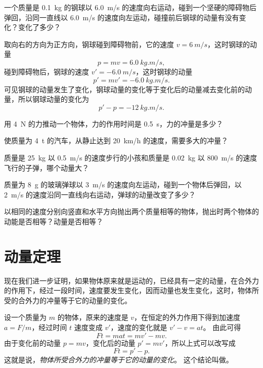 \begin{example}
一个质量是 \qty{0.1}{kg} 的钢球以 \qty{6.0}{m/s} 的速度向右运动，碰到一个坚硬的障碍物后弹回，沿同一直线以 \qty{6.0}{m/s} 的速度向左运动，碰撞前后钢球的动量有没有变化？变化了多少？
\end{example}

\begin{solution}
取向右的方向为正方向，钢球碰到障碍物前，它的速度 $v=\qty{6}{m/s}$，这时钢球的动量
\[p=mv=\qty{6.0}{kg.m/s},\]
碰到障碍物后，钢球的速度 $v'=\qty{-6.0}{m/s}$，这时钢球的动量
\[p'=mv'=\qty{-6.0}{kg.m/s}.\]
可见钢球的动量发生了变化，钢球动量的变化等于变化后的动量减去变化前的动量，所以钢球动量的变化为
\[p'-p=\qty{-12}{kg.m/s}.\]
\end{solution}

\begin{Practice}
\begin{question}
  \item 用 \qty{4}{N} 的力推动一个物体，力的作用时间是 \qty{0.5}{s}，力的冲量是多少？
  \item 使质量为 \qty{4}{t} 的汽车，从静止达到 \qty{20}{km/h} 的速度，需要多大的冲量？
  \item 质量是 \qty{25}{kg} 以 \qty{0.5}{m/s} 的速度步行的小孩和质量是 \qty{0.02}{kg} 以 \qty{800}{m/s} 的速度飞行的子弹，哪个动量大？
  \item 质量为 \qty{8}{g} 的玻璃弹球以 \qty{3}{m/s} 的速度向左运动，碰到一个物体后弹回，以 \qty{2}{m/s} 的速度沿同一直线向右运动，弹球的动量改变了多少？
  \item 以相同的速度分别向竖直和水平方向抛出两个质量相等的物体，抛出时两个物体的动能是否相等？动量是否相等？
\end{question}
\end{Practice}

\section{动量定理}
现在我们进一步证明，如果物体原来就是运动的，已经具有一定的动量，在合外力的作用下，经过一段时间，速度要发生变化，因而动量也发生变化，这时，物体所受的合外力的冲量等于它的动量的变化。

设一个质量为 $m$ 的物体，原来的速度是 $v$，在恒定的外力作用下得到加速度 $a=F/m$，经过时间 $t$ 速度变成 $v'$，速度的变化就是 $v'-v=at$。
由此可得
\[Ft=mat=mv'-mv.\]
由于变化前的动量 $p=mv$，变化后的动量 $p'=mv'$，所以上式可以改写成
\[Ft=p'-p.\]
这就是说，\emph{物体所受合外力的冲量等于它的动量的变化}。
这个结论叫做。


